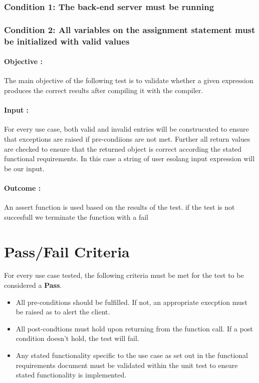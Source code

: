 \documentclass[english]{article}
\begin{document}
				\subsubsection{Condition 1: The back-end server must be running } 
				\subsubsection{Condition 2: All variables on the assignment statement must be initialized with valid values } 
				\paragraph{Objective :} The main objective of the following test is to validate whether a given expression produces the correct results after compiling it with the compiler.
				\paragraph{Input :} For every use case, both valid and invalid entries will be construcuted to ensure that exceptions are raised if pre-condiions are not met. Further all return values are checked to ensure that the returned object is correct according the stated
				functional requirements. In this case a string of user  esolang input expression will be our input.
				
				\paragraph{Outcome :}An assert function is used based on the results of the test. if the test is not succesfull we terminate the function with a fail \\
				
		 	
	\newpage
		   \section{Pass/Fail Criteria}
		   For every use case tested, the following criteria must be met for the test to be
		   considered a \textbf{Pass}.
		   \begin{itemize}
		   	\item All pre-conditions should be fulfilled. If not, an appropriate execption
		   	must be raised as to alert the client.
		   	\item All post-condtions must hold upon returning from the function call. If 
		   	a post condition doesn't hold, the test will fail.
		   	\item Any stated functionality specific to the use case as set out in the
		   	functional requirements document must be validated within the unit test to
		   	ensure stated functionality is implemented.
		   \end{itemize}
	
\end{document}
